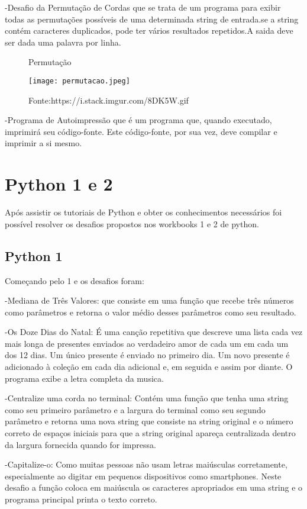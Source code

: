     -Desafio da Permutação de Cordas que se trata de um programa para exibir todas as permutações possíveis de uma determinada string de entrada.se a string contém caracteres duplicados, pode ter vários resultados repetidos.A saida deve ser dada uma palavra por linha.

\begin{figure} [h!]	
    \centering
    \caption{Permutação}
    \texttt{[image: permutacao.jpeg]}
    \caption*{Fonte:https://i.stack.imgur.com/8DK5W.gif}
    \label{fig:permutacaodeletras}
\end{figure}

-Programa de Autoimpressão que é um programa que, quando executado, imprimirá seu código-fonte. Este código-fonte, por sua vez, deve compilar e imprimir a si mesmo. 

\section{Python 1 e 2}
Após assistir os tutoriais de Python e obter os conhecimentos necessários foi possível resolver os desafios propostos nos workbooks 1 e 2 de python.

\subsection{Python 1}

Começando pelo 1 e os desafios foram: 

-Mediana de Três Valores: que consiste em uma função que recebe três números como parâmetros e retorna o valor médio desses parâmetros como seu resultado.

-Os Doze Dias do Natal: É uma canção repetitiva que descreve uma lista cada vez mais longa de presentes enviados ao verdadeiro amor de cada um em cada um dos 12 dias. Um único presente é enviado no primeiro dia. Um novo presente é adicionado à coleção em cada dia adicional e, em seguida e assim por diante.
O programa exibe a letra completa da musica.

-Centralize uma corda no terminal: Contém uma função que tenha uma string como seu primeiro parâmetro e a largura do terminal como seu segundo parâmetro e retorna uma nova string que consiste na string original e o número correto de espaços iniciais para que a string original apareça centralizada dentro da largura fornecida quando for impressa.

-Capitalize-o: Como muitas pessoas não usam letras maiúsculas corretamente, especialmente ao digitar em pequenos dispositivos como smartphones. Neste desafio a função coloca em maiúscula os caracteres apropriados em uma string e o programa principal printa o texto correto.

